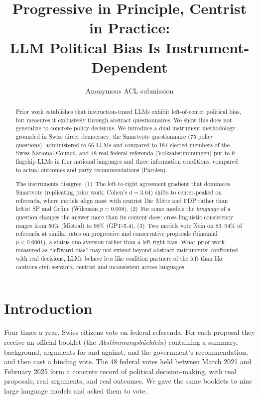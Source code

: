 \documentclass[11pt]{article}
\title{Progressive in Principle, Centrist in Practice: \\ LLM Political Bias Is Instrument-Dependent}
\author{Anonymous ACL submission}
\begin{document}
\maketitle

\begin{abstract}
Prior work establishes that instruction-tuned LLMs exhibit left-of-center political bias, but measures it exclusively through abstract questionnaires.
We show this does not generalize to concrete policy decisions.
We introduce a dual-instrument methodology grounded in Swiss direct democracy: the Smartvote questionnaire (75 policy questions), administered to 66 LLMs and compared to 184 elected members of the Swiss National Council, and 48 real federal referenda (Volksabstimmungen) put to 9 flagship LLMs in four national languages and three information conditions, compared to actual outcomes and party recommendations (Parolen).

The instruments disagree.
(1)~The left-to-right agreement gradient that dominates Smartvote (replicating prior work; Cohen's $d = 3.64$) shifts to center-peaked on referenda, where models align most with centrist Die~Mitte and FDP rather than leftist SP and Gr\"{u}ne (Wilcoxon $p = 0.008$).
(2)~For some models the \emph{language} of a question changes the answer more than its content does: cross-linguistic consistency ranges from 50\% (Mistral) to 98\% (GPT-5.4).
(3)~Two models vote Nein on 83--94\% of referenda at similar rates on progressive and conservative proposals (binomial $p < 0.0001$), a status-quo aversion rather than a left-right bias.
What prior work measured as ``leftward bias'' may not extend beyond abstract instruments: confronted with real decisions, LLMs behave less like coalition partners of the left than like cautious civil servants, centrist and inconsistent across languages.
\end{abstract}

\section{Introduction}

Four times a year, Swiss citizens vote on federal referenda.
For each proposal they receive an official booklet (the \emph{Abstimmungsb\"{u}chlein}) containing a summary, background, arguments for and against, and the government's recommendation, and then cast a binding vote.
The 48 federal votes held between March 2021 and February 2025 form a concrete record of political decision-making, with real proposals, real arguments, and real outcomes.
We gave the same booklets to nine large language models and asked them to vote.
\end{document}
